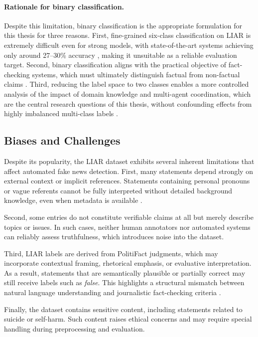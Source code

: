 \paragraph{Rationale for binary classification.}
Despite this limitation, binary classification is the appropriate formulation for this thesis for three reasons. First, fine-grained 
six-class classification on LIAR is extremely difficult even for strong models, with state-of-the-art systems achieving only around 
27--30\% accuracy \cite{wang2017liarliarpantsfire}, making it unsuitable as a reliable evaluation target. Second, binary 
classification aligns with the practical objective of fact-checking systems, which must ultimately distinguish factual from non-factual claims \cite{vykopal2024generativelargelanguagemodels}. Third, reducing the label space to two classes enables a more controlled analysis of the impact of domain knowledge and multi-agent coordination, which are the central research questions of this 
thesis, without confounding effects from highly imbalanced multi-class labels \cite{hasan2025generalizationgapspoliticalfake}.

\subsection{Biases and Challenges}

Despite its popularity, the LIAR dataset exhibits several inherent limitations that affect automated fake news detection. First, many statements depend strongly on external context or implicit references. Statements containing personal pronouns or vague referents cannot be fully interpreted without detailed background knowledge, even when metadata is available \cite{wang2017liarliarpantsfire}.

Second, some entries do not constitute verifiable claims at all but merely describe topics or issues. In such cases, neither human annotators nor automated systems can reliably assess truthfulness, which introduces noise into the dataset.

Third, LIAR labels are derived from PolitiFact judgments, which may incorporate contextual framing, rhetorical emphasis, or evaluative interpretation. As a result, statements that are semantically plausible or partially correct may still receive labels such as \textit{false}. This highlights a structural mismatch between natural language understanding and journalistic fact-checking criteria \cite{wang2017liarliarpantsfire}.

Finally, the dataset contains sensitive content, including statements related to suicide or self-harm. Such content raises ethical concerns and may require special handling during preprocessing and evaluation.

